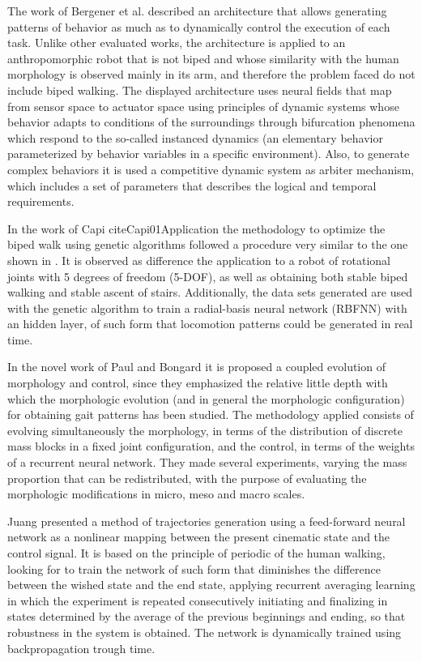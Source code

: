 The work of Bergener et al. \cite{Bergener99Complex} described an architecture that allows generating patterns of behavior as much as to dynamically control the execution of each task. Unlike other evaluated works, the architecture is applied to an anthropomorphic robot that is not biped and whose similarity with the human morphology is observed mainly in its arm, and therefore the problem faced do not include biped walking. The displayed architecture uses neural fields that map from sensor space to actuator space using principles of dynamic systems whose behavior adapts to conditions of the surroundings through bifurcation phenomena which respond to the so-called instanced dynamics (an elementary behavior parameterized by behavior variables in a specific environment). Also, to generate complex behaviors it is used a competitive dynamic system as arbiter mechanism, which includes a set of parameters that describes the logical and temporal requirements. 


In the work of Capi cite{Capi01Application} the methodology to optimize the biped walk using genetic algorithms followed a procedure very similar to the one shown in \cite{Capi02Optimal}. It is observed as difference the application to a robot of rotational joints with 5 degrees of freedom (5-DOF), as well as obtaining both stable biped walking and stable ascent of stairs. Additionally, the data sets generated are used with the genetic algorithm to train a radial-basis neural network (RBFNN) with an hidden layer, of such form that locomotion patterns could be generated in real time. 


In the novel work of Paul and Bongard \cite{Paul01road} it is proposed a coupled evolution of morphology and control, since they emphasized the relative little depth with which the morphologic evolution (and in general the morphologic configuration) for obtaining gait patterns has been studied. The methodology applied consists of evolving simultaneously the morphology, in terms of the distribution of discrete mass blocks in a fixed joint configuration, and the control, in terms of the weights of a recurrent neural network. They made several experiments, varying the mass proportion that can be redistributed, with the purpose of evaluating the morphologic modifications in micro, meso and macro scales. 


Juang \cite{Juang02Intelligent} presented a method of trajectories generation using a feed-forward neural network as a nonlinear mapping between the present cinematic state and the control signal. It is based on the principle of periodic of the human walking, looking for to train the network of such form that diminishes the difference between the wished state and the end state, applying recurrent averaging learning in which the experiment is repeated consecutively initiating and finalizing in states determined by the average of the previous beginnings and ending, so that robustness in the system is obtained. The network is dynamically trained using backpropagation trough time. 


